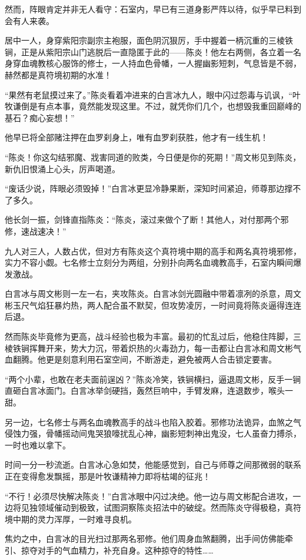 然而，阵眼肯定并非无人看守：石室内，早已有三道身影严阵以待，似乎早已料到会有人来袭。

居中一人，身穿紫阳宗副宗主袍服，面色阴沉狠厉，手中握着一柄沉重的三棱铁锏，正是从紫阳宗山门逃脱后一直隐匿于此的——陈炎！他左右两侧，各立着一名身穿血魂教核心服饰的修士，一人持血色骨幡，一人握幽影短刺，气息皆是不弱，赫然都是真符境初期的水准！

“果然有老鼠摸过来了。”陈炎看着冲进来的白言冰九人，眼中闪过怨毒与讥讽，“叶牧谦倒是有点本事，竟然能发现这里。不过，就凭你们几个，也想毁我重回巅峰的基石？痴心妄想！”

他早已将全部赌注押在血罗刹身上，唯有血罗刹获胜，他才有一线生机！

“陈炎！你这勾结邪魔、戕害同道的败类，今日便是你的死期！”周文彬见到陈炎，新仇旧恨涌上心头，厉声喝道。

“废话少说，阵眼必须毁掉！”白言冰更显冷静果断，深知时间紧迫，师尊那边撑不了多久。

他长剑一振，剑锋直指陈炎：“陈炎，滚过来做个了断！其他人，对付那两个邪修，速战速决！”

九人对三人，人数占优，但对方有陈炎这个真符境中期的高手和两名真符境邪修，实力不容小觑。七名修士立刻分为两组，分别扑向两名血魂教高手，石室内瞬间爆发激战。

白言冰与周文彬则一左一右，夹攻陈炎。白言冰剑光圆融中带着凛冽的杀意，周文彬玉尺气焰狂暴灼热，两人配合虽不默契，但攻势凌厉，一时间竟将陈炎逼得连连后退。

然而陈炎毕竟修为更高，战斗经验也极为丰富。最初的忙乱过后，他稳住阵脚，三棱铁锏挥舞开来，势大力沉，带着炽热的火毒劲力，每一击都让白言冰和周文彬气血翻腾。他更是刻意利用石室空间，不断游走，避免被两人合击锁定要害。

“两个小辈，也敢在老夫面前逞凶？”陈炎冷笑，铁锏横扫，逼退周文彬，反手一锏直砸白言冰面门。白言冰举剑硬挡，轰然巨响中，手臂发麻，连退数步，喉头一甜。

另一边，七名修士与两名血魂教高手的战斗也陷入胶着。邪修功法诡异，血煞之气侵蚀力强，骨幡摇动间鬼哭狼嚎扰乱心神，幽影短刺神出鬼没，七人虽奋力搏杀，一时也难以拿下。

时间一分一秒流逝。白言冰心急如焚，他能感觉到，自己与师尊之间那微弱的联系正在变得愈发飘摇，那是叶牧谦精神力即将枯竭的征兆！

“不行！必须尽快解决陈炎！”白言冰眼中闪过决绝。他一边与周文彬配合进攻，一边将见独领域催动到极致，试图洞察陈炎招法中的破绽。然而陈炎守得极稳，真符境中期的灵力浑厚，一时难寻良机。

焦灼之中，白言冰的目光扫过那两名邪修。他们周身血煞翻腾，出手间仿佛能牵引、掠夺对手的气血精力，补充自身。这种掠夺的特性……

